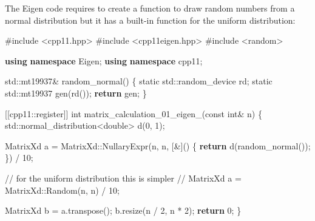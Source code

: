 \documentclass[12pt]{article}
\newenvironment{Shaded}{\begin{snugshade}}{\end{snugshade}}
\newcommand{\AttributeTok}[1]{\textcolor[rgb]{0.40,0.45,0.13}{#1}}
\newcommand{\BuiltInTok}[1]{\textcolor[rgb]{0.00,0.23,0.31}{#1}}
\newcommand{\CommentTok}[1]{\textcolor[rgb]{0.37,0.37,0.37}{#1}}
\newcommand{\ControlFlowTok}[1]{\textcolor[rgb]{0.00,0.23,0.31}{\textbf{#1}}}
\newcommand{\DataTypeTok}[1]{\textcolor[rgb]{0.68,0.00,0.00}{#1}}
\newcommand{\DecValTok}[1]{\textcolor[rgb]{0.68,0.00,0.00}{#1}}
\newcommand{\ImportTok}[1]{\textcolor[rgb]{0.00,0.46,0.62}{#1}}
\newcommand{\KeywordTok}[1]{\textcolor[rgb]{0.00,0.23,0.31}{\textbf{#1}}}
\newcommand{\NormalTok}[1]{\textcolor[rgb]{0.00,0.23,0.31}{#1}}
\newcommand{\OperatorTok}[1]{\textcolor[rgb]{0.37,0.37,0.37}{#1}}
\newcommand{\PreprocessorTok}[1]{\textcolor[rgb]{0.68,0.00,0.00}{#1}}
\newcommand{\VariableTok}[1]{\textcolor[rgb]{0.07,0.07,0.07}{#1}}
\begin{document}
The Eigen code requires to create a function to draw random numbers from
a normal distribution but it has a built-in function for the uniform
distribution:

\begin{Shaded}
\begin{Highlighting}[]
\PreprocessorTok{\#include }\ImportTok{\textless{}cpp11.hpp\textgreater{}}
\PreprocessorTok{\#include }\ImportTok{\textless{}cpp11eigen.hpp\textgreater{}}
\PreprocessorTok{\#include }\ImportTok{\textless{}random\textgreater{}}

\KeywordTok{using} \KeywordTok{namespace}\NormalTok{ Eigen}\OperatorTok{;}
\KeywordTok{using} \KeywordTok{namespace}\NormalTok{ cpp11}\OperatorTok{;}

\BuiltInTok{std::}\NormalTok{mt19937}\OperatorTok{\&}\NormalTok{ random\_normal}\OperatorTok{()} \OperatorTok{\{}
  \AttributeTok{static} \BuiltInTok{std::}\NormalTok{random\_device rd}\OperatorTok{;}
  \AttributeTok{static} \BuiltInTok{std::}\NormalTok{mt19937 gen}\OperatorTok{(}\NormalTok{rd}\OperatorTok{());}
  \ControlFlowTok{return}\NormalTok{ gen}\OperatorTok{;}
\OperatorTok{\}}

\OperatorTok{[[}\AttributeTok{cpp11}\OperatorTok{::}\AttributeTok{register}\OperatorTok{]]} \DataTypeTok{int} \VariableTok{matrix\_calculation\_01\_eigen\_}\OperatorTok{(}\AttributeTok{const} \DataTypeTok{int}\OperatorTok{\&}\NormalTok{ n}\OperatorTok{)} \OperatorTok{\{}
  \BuiltInTok{std::}\NormalTok{normal\_distribution}\OperatorTok{\textless{}}\DataTypeTok{double}\OperatorTok{\textgreater{}}\NormalTok{ d}\OperatorTok{(}\DecValTok{0}\OperatorTok{,} \DecValTok{1}\OperatorTok{);}
  
\NormalTok{  MatrixXd a }\OperatorTok{=}\NormalTok{ MatrixXd}\OperatorTok{::}\NormalTok{NullaryExpr}\OperatorTok{(}\NormalTok{n}\OperatorTok{,}\NormalTok{ n}\OperatorTok{,} \OperatorTok{[\&]()} \OperatorTok{\{}
    \ControlFlowTok{return}\NormalTok{ d}\OperatorTok{(}\NormalTok{random\_normal}\OperatorTok{());}
  \OperatorTok{\})} \OperatorTok{/} \DecValTok{10}\OperatorTok{;}

  \CommentTok{// for the uniform distribution this is simpler}
  \CommentTok{// MatrixXd a = MatrixXd::Random(n, n) / 10;}

\NormalTok{  MatrixXd b }\OperatorTok{=}\NormalTok{ a}\OperatorTok{.}\NormalTok{transpose}\OperatorTok{();}
\NormalTok{  b}\OperatorTok{.}\NormalTok{resize}\OperatorTok{(}\NormalTok{n }\OperatorTok{/} \DecValTok{2}\OperatorTok{,}\NormalTok{ n }\OperatorTok{*} \DecValTok{2}\OperatorTok{);}
  \ControlFlowTok{return} \DecValTok{0}\OperatorTok{;}
\OperatorTok{\}}
\end{Highlighting}
\end{Shaded}
\end{document}
